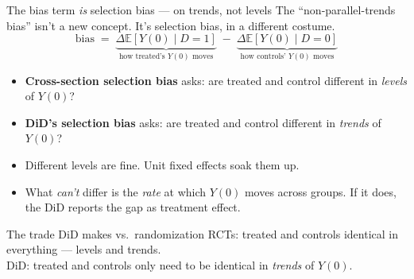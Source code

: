 \documentclass[aspectratio=169,11pt]{beamer}
\begin{document}
\begin{frame}{The bias term \textit{is} selection bias --- on trends, not levels}
\footnotesize
The ``non-parallel-trends bias'' isn't a new concept. It's selection bias, in a different costume.
\vspace{-0.5em}
\[
\text{bias} \;=\; \underbrace{\Delta\mathbb{E}[Y(0)\mid D{=}1]}_{\text{how treated's $Y(0)$ moves}} \;-\; \underbrace{\Delta\mathbb{E}[Y(0)\mid D{=}0]}_{\text{how controls' $Y(0)$ moves}}
\]
\vspace{-0.4em}
\begin{itemize}
  \item \textbf{Cross-section selection bias} asks: are treated and control different in \textit{levels} of $Y(0)$?
  \item \textbf{DiD's selection bias} asks: are treated and control different in \textit{trends} of $Y(0)$?
  \item Different levels are fine. Unit fixed effects soak them up.
  \item What \textit{can't} differ is the \textit{rate} at which $Y(0)$ moves across groups. If it does, the DiD reports the gap as treatment effect.
\end{itemize}
\vspace{0.2em}
\begin{block}{The trade DiD makes vs.\ randomization}
RCTs: treated and controls identical in everything --- levels and trends. \\
DiD: treated and controls only need to be identical in \textit{trends} of $Y(0)$. \;
\end{block}
\end{frame}

\end{document}
